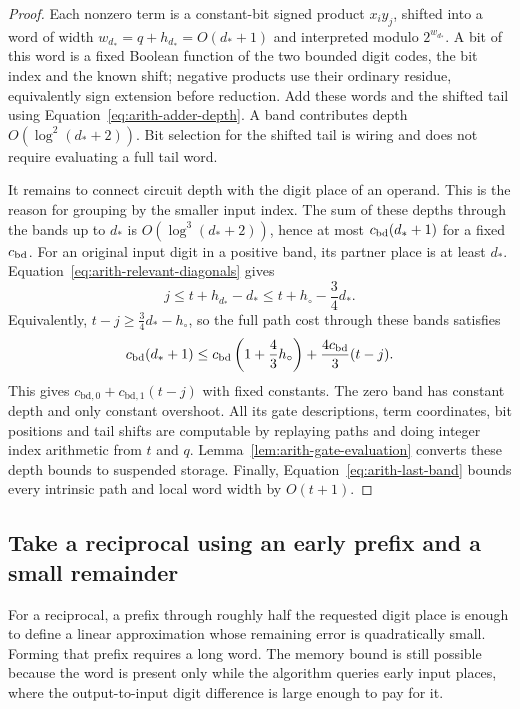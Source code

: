 \documentclass[11pt]{article}
\numberwithin{equation}{section}
\theoremstyle{definition}
\theoremstyle{remark}
\begin{document}
\begin{proof}
Each nonzero term is a constant-bit signed product $x_i y_j$,
shifted into a word of width ${w}_{d_*}=q+h_{d_*}=O({d_*}+1)$ and interpreted
modulo $2^{{w}_{d_*}}$.  A bit of this word is a fixed Boolean function
of the two bounded digit codes, the bit index and the known shift;
negative products use their ordinary residue, equivalently sign
extension before reduction.  Add these words and the shifted tail
using Equation~\eqref{eq:arith-adder-depth}.  A band contributes
depth $O(\log^2({d_*}+2))$.  Bit selection for the shifted tail is
wiring and does not require evaluating a full tail word.

It remains to connect circuit depth with the digit place of an operand. This is the reason for grouping by the smaller input index. The sum of these depths through the bands up to ${d_*}$ is
$O(\log^3({d_*}+2))$, hence at most ${c_{\rm bd}}({d_*}+1)$ for a fixed ${c_{\rm bd}}$.
For an original input digit in a positive band, its partner place
is at least ${d_*}$.  Equation~\eqref{eq:arith-relevant-diagonals} gives
\begin{equation}
 j\leq t+h_{d_*}-{d_*}
       \leq t+h_\circ-\frac34{d_*}.
 \label{eq:arith-multiplication-latency}
\end{equation}
Equivalently, $t-j\geq\tfrac34{d_*}-h_\circ$, so the full path cost
through these bands satisfies
\[
 {c_{\rm bd}}({d_*}+1)\leq {c_{\rm bd}}\left(1+\frac43h_\circ\right)
                   +\frac{4{c_{\rm bd}}}{3}(t-j).
\]
This gives ${c_{\mathrm{bd},0}}+{c_{\mathrm{bd},1}}(t-j)$ with fixed constants.  The zero band
has constant depth and only constant overshoot.  All its gate
descriptions, term coordinates, bit positions and tail shifts are
computable by replaying paths and doing integer index arithmetic
from $t$ and $q$.  Lemma~\ref{lem:arith-gate-evaluation} converts these
depth bounds to suspended storage.  Finally,
Equation~\eqref{eq:arith-last-band} bounds every intrinsic path
and local word width by $O(t+1)$.
\end{proof}

\subsection{Take a reciprocal using an early prefix and a small remainder}

For a reciprocal, a prefix through roughly half the requested digit place is enough to define a linear approximation whose remaining error is quadratically small. Forming that prefix requires a long word. The memory bound is still possible because the word is present only while the algorithm queries early input places, where the output-to-input digit difference is large enough to pay for it.
\end{document}
